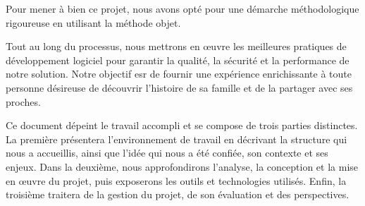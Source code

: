 Pour mener à bien ce projet, nous avons opté pour une démarche méthodologique
rigoureuse en utilisant la méthode objet.

Tout au long du processus, nous
mettrons en œuvre les meilleures pratiques de développement logiciel pour
garantir la qualité, la sécurité et la performance de notre solution.
Notre objectif esr de fournir une expérience enrichissante à toute
personne désireuse de découvrir l’histoire de sa famille et de la partager avec ses proches.

Ce document dépeint le travail accompli et se compose de trois parties distinctes.
La première présentera l’environnement de travail en décrivant la structure qui
nous a accueillis, ainsi que l’idée qui nous a été confiée, son contexte et ses
enjeux. Dans la deuxième, nous approfondirons l’analyse, la conception et la
mise en œuvre du projet, puis exposerons les outils et technologies utilisés.
Enfin, la troisième traitera de la gestion du projet, de son évaluation et des perspectives.
